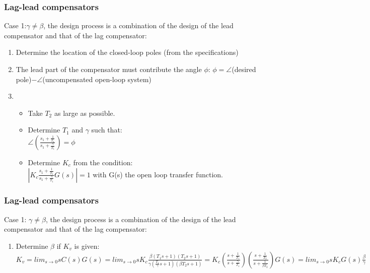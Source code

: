 \begin{frame}
	\frametitle{Lag-lead compensators}
	Case 1:$\gamma\neq \beta$,  the design process is a combination of the design of the lead compensator and that of the lag compensator:
	\begin{enumerate}
		\item Determine the location of the closed-loop poles (from the specifications)
		\item The lead part of the compensator must contribute the angle $\phi$: $\phi=\angle$(desired pole)$-\angle$(uncompensated open-loop system)
		\item 
		\begin{itemize}
			\item Take $T_2$ as large as possible.
			\item Determine $T_1$ and $\gamma$ such that:\\ 
			$\angle(\frac{s_1+\frac{1}{T_1}}{s_1+\frac{\gamma}{T_1}})=\phi$
			\item Determine $K_c$ from the condition:\\
			$|K_c\frac{s_1+\frac{1}{T_1}}{s_1+\frac{\gamma}{T_1}}G(s)|=1$ with G(s) the open loop transfer function.
		\end{itemize}
	\end{enumerate}
\end{frame}

\begin{frame}
	\frametitle{Lag-lead compensators}
	Case 1: $\gamma\neq \beta$,  the design process is a combination of the design of the lead compensator and that of the lag compensator:
	\begin{enumerate}
		\setcounter{enumerate}{3}
		\item Determine $\beta$ if $K_v$ is given:
		$K_v=lim_{s\to0}sC(s)G(s)=
		lim_{s\to0}sK_c\frac{\beta (T_1s+1)(T_2s+1)}{\gamma (\frac{T_1}{\gamma}s+1)(\beta T_2s+1)}=
		K_c(\frac{s+\frac{1}{T_1}}{s+\frac{\gamma}{T_1}})
		(\frac{s+\frac{1}{T_2}}{s+\frac{1}{\beta T_2}})G(s)=
		lim_{s\to0}sK_cG(s)\frac{\beta}{\gamma}$
	\end{enumerate}
\end{frame}




